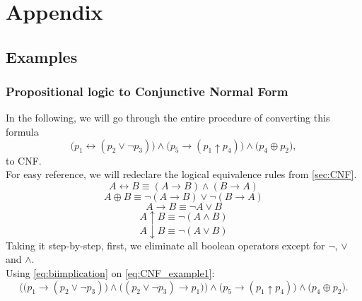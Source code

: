 \section{Appendix}
\subsection{Examples}
\subsubsection{Propositional logic to Conjunctive Normal Form}\label{sec:CNF_conversion_Examp}
In the following, we will go through the entire procedure of converting this formula
\begin{equation}\label{eq:CNF_example1}
    \Big(
        p_1 \leftrightarrow (
            p_2 \vee \neg p_3
        )
    \Big) \wedge \Big(
        p_5 \rightarrow (
            p_1 \uparrow p_4
        )
    \Big) \wedge \Big(
        p_4 \oplus p_2
    \Big),
\end{equation}
 to CNF.
\\
For easy reference, we will redeclare the logical equivalence rules from \autoref{sec:CNF}.
\begin{equation}\label{eq:biimplication}
    A \leftrightarrow B \equiv (A \rightarrow  B) \wedge (B \rightarrow A)
\end{equation}
\begin{equation}\label{eq:XOR}
    A \oplus B \equiv \neg (A \rightarrow B) \vee \neg (B \rightarrow A)
\end{equation}
\begin{equation}\label{eq:implication}
    A \rightarrow B \equiv \neg A \vee B
\end{equation}
\begin{equation}\label{eq:NAND}
    A \uparrow B \equiv \neg (A \wedge B)
\end{equation}
\begin{equation}\label{NOR}
    A \downarrow B \equiv \neg (A \vee B)
\end{equation}
Taking it step-by-step, first, we eliminate all boolean operators except for $\neg$, $\vee$ and $\wedge$.
\\
Using \autoref{eq:biimplication} on \autoref{eq:CNF_example1}:
\begin{equation}\label{eq:CNF_example2}
    \bigg(
        \Big(
            p_1 \rightarrow (
                p_2 \vee \neg p_3
            )
        \Big) \wedge \Big(
                (
                    p_2 \vee \neg p_3 
                ) \rightarrow p_1 
            \Big)
    \bigg) \wedge \Big(
        p_5 \rightarrow (
            p_1 \uparrow p_4
        )
    \Big) \wedge \Big(
        p_4 \oplus p_2
    \Big).
\end{equation}
